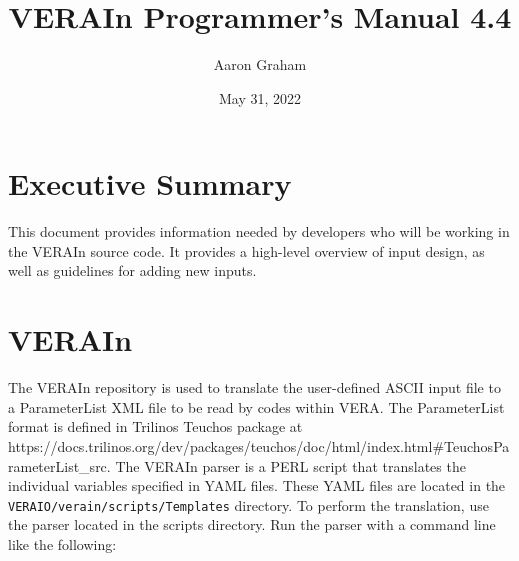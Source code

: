 \documentclass{vera-ornltm}
\author{Aaron Graham}
\affil{Oak Ridge National Laboratory}
\title{VERAIn Programmer's Manual 4.4}
\date{May 31, 2022}
\renewcommand{\marginpar}[1]{{\small\em\color{note}[#1]}}
\begin{document}
\frontmatter



\section*{Executive Summary}

This document provides information needed by developers who will be working in the VERAIn source code. 
It provides a high-level overview of input design, as well as guidelines for adding new inputs.

\tableofcontents

\mainmatter
\section{VERAIn}

The VERAIn repository is used to translate the user-defined ASCII input file to a ParameterList XML file to be read by codes within VERA. 
The ParameterList format is defined in Trilinos Teuchos package at\\
https://docs.trilinos.org/dev/packages/teuchos/doc/html/index.html\#TeuchosParameterList\_src.
The VERAIn parser is a PERL script that translates the individual variables specified in YAML files. 
These YAML files are located in the \texttt{VERAIO/verain/scripts/Templates} directory.
To perform the translation, use the parser located in the scripts directory. 
Run the parser with a command line like the following:
\end{document}
